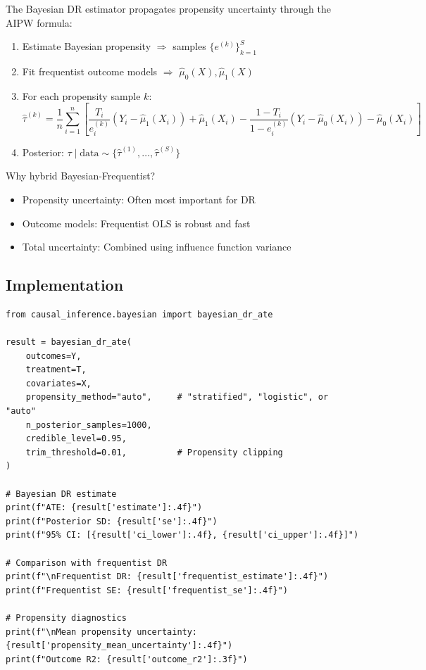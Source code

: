 The Bayesian DR estimator propagates propensity uncertainty through the AIPW formula:

\begin{enumerate}
\item Estimate Bayesian propensity $\Rightarrow$ samples $\{e^{(k)}\}_{k=1}^S$
\item Fit frequentist outcome models $\Rightarrow$ $\hat{\mu}_0(X), \hat{\mu}_1(X)$
\item For each propensity sample $k$:
\begin{equation}
\hat{\tau}^{(k)} = \frac{1}{n} \sum_{i=1}^n \left[ \frac{T_i}{e_i^{(k)}} (Y_i - \hat{\mu}_1(X_i)) + \hat{\mu}_1(X_i) - \frac{1-T_i}{1-e_i^{(k)}} (Y_i - \hat{\mu}_0(X_i)) - \hat{\mu}_0(X_i) \right]
\end{equation}
\item Posterior: $\tau \mid \text{data} \sim \{\hat{\tau}^{(1)}, \ldots, \hat{\tau}^{(S)}\}$
\end{enumerate}

\begin{insight}
Why hybrid Bayesian-Frequentist?
\begin{itemize}
\item Propensity uncertainty: Often most important for DR
\item Outcome models: Frequentist OLS is robust and fast
\item Total uncertainty: Combined using influence function variance
\end{itemize}
\end{insight}

\subsection{Implementation}

\begin{verbatim}
from causal_inference.bayesian import bayesian_dr_ate

result = bayesian_dr_ate(
    outcomes=Y,
    treatment=T,
    covariates=X,
    propensity_method="auto",     # "stratified", "logistic", or "auto"
    n_posterior_samples=1000,
    credible_level=0.95,
    trim_threshold=0.01,          # Propensity clipping
)

# Bayesian DR estimate
print(f"ATE: {result['estimate']:.4f}")
print(f"Posterior SD: {result['se']:.4f}")
print(f"95% CI: [{result['ci_lower']:.4f}, {result['ci_upper']:.4f}]")

# Comparison with frequentist DR
print(f"\nFrequentist DR: {result['frequentist_estimate']:.4f}")
print(f"Frequentist SE: {result['frequentist_se']:.4f}")

# Propensity diagnostics
print(f"\nMean propensity uncertainty: {result['propensity_mean_uncertainty']:.4f}")
print(f"Outcome R2: {result['outcome_r2']:.3f}")
\end{verbatim}

